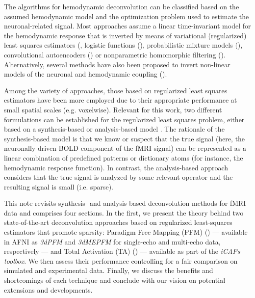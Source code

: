 The algorithms for hemodynamic deconvolution can be classified based on the assumed hemodynamic model and the optimization problem used to estimate the neuronal-related signal. Most approaches assume a linear time-invariant model for the hemodynamic response that is inverted by means of variational (regularized) least squares estimators (\citealt{glover1999deconvolution,gitelman2003ModelingRegionalPsychophysiologic,karahanoglu2013TotalActivationfMRI,gaudes2011DetectionCharacterizationSingletrial,caballero-gaudes2019DeconvolutionAlgorithmMultiecho,caballerogaudes2013ParadigmFreeMapping,gaudes2012StructuredSparseDeconvolution,cherkaoui2019SparsitybasedBlindDeconvolution,hernandez2011neuronal,costantini2021,Huetel2021}, logistic functions (\citealt{Bush2013,Bush2015a,Loula2018}), probabilistic mixture models (\cite{pidnebesna2019}), convolutional autoencoders (\citealt{hutel2018neural}) or nonparametric homomorphic filtering (\citealt{Sreenivasan2015}). Alternatively, several methods have also been proposed to invert non-linear models of the neuronal and hemodynamic coupling (\citealt{Riera2004,Friston2008,Havlicek2011,Aslan2016,Madi2017,RuizEuler2018}). 

Among the variety of approaches, those based on regularized least squares estimators have been more employed due to their appropriate performance at small spatial scales (e.g. voxelwise). Relevant for this work, two different formulations can be established for the regularized least squares problem, either based on a synthesis-based or analysis-based model \citealt{elad2007AnalysisSynthesisSignal,ortelli2019SynthesisAnalysisTotal}. The rationale of the synthesis-based model is that we know or suspect that the true signal (here, the neuronally-driven BOLD component of the fMRI signal) can be represented as a linear combination of predefined patterns or dictionary atoms (for instance, the hemodynamic response function). In contrast, the analysis-based approach considers that the true signal is analyzed by some relevant operator and the resulting signal is small (i.e. sparse).  

This note revisits synthesis- and analysis-based deconvolution methods for fMRI data and comprises four sections. In the first, we present the theory behind two state-of-the-art deconvolution approaches based on regularized least-squares estimators that promote sparsity: Paradigm Free Mapping (PFM) (\citealt{caballerogaudes2013ParadigmFreeMapping}) --- available in AFNI as \textit{3dPFM} and \textit{3dMEPFM} for single-echo and multi-echo data, respectively --- and Total Activation (TA) (\citealt{karahanoglu2013TotalActivationfMRI}) --- available as part of the \textit{iCAPs toolbox}. We then assess their performance controlling for a fair comparison on simulated and experimental data. Finally, we discuss the benefits and shortcomings of each technique and conclude with our vision on potential extensions and developments.
